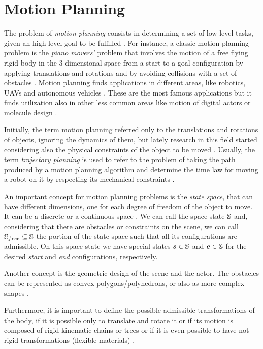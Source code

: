 \documentclass[dissertation.tex]{subfiles}
\begin{document}
\chapter{Motion Planning}
The problem of \emph{motion planning} consists in determining a set of
low level tasks, given an high level goal to be fulfilled
\cite{choset}. For instance, a classic motion planning problem is the
\emph{piano movers'} problem that involves the motion of a free flying rigid 
body in the 3-dimensional space
 from a start to a goal configuration by applying
translations and rotations and by avoiding collisions with a set
of obstacles \cite{choset}\cite{lavalle}. Motion planning finds
applications in 
different areas, like robotics, \acp{UAV} \cite{goerzen} and autonomous
vehicles \cite{paden}. These are the most
famous applications but it finds utilization also in other less
common areas like motion of digital actors or molecule design
\cite{choset}.

Initially, the term motion planning referred only to the translations
and rotations of objects, ignoring the dynamics of them, but lately
research in this field started considering also the physical
constraints of the object to be moved \cite{lavalle}. Usually, the term
\emph{trajectory planning} is used to refer to the problem of taking
the path produced by a
motion planning algorithm and determine the time law for moving a
robot on it by
respecting its mechanical constraints \cite{lavalle}.

An important concept for motion planning problems is the \emph{state
  space},
that can have different dimensions, one for each degree of freedom of
the object to move. It can be a discrete or a continuous space
\cite{lavalle}. We can call the space state $\mathbb{S}$
and, considering that there are obstacles or constraints on the scene,
we can call $\mathbb{S}_{free}\subseteq\mathbb{S}$
the portion of the state space such that all its configurations
are admissible. On this space state we have
special states $\boldsymbol{s}\in\mathbb{S}$ and $\boldsymbol{e}\in\mathbb{S}$ for the
desired \emph{start} and \emph{end} configurations, respectively.

Another concept is the geometric design of the scene and the
actor. The obstacles can be represented as convex
polygons/polyhedrons, or also as more complex
shapes \cite{lavalle}.

Furthermore, it is important to define the possible admissible
transformations of the body, if it is 
possible only to translate and rotate it or if its motion is composed of
rigid kinematic chains or trees or if it is even possible to have not
rigid transformations (flexible materials) \cite{lavalle}.
\end{document}
